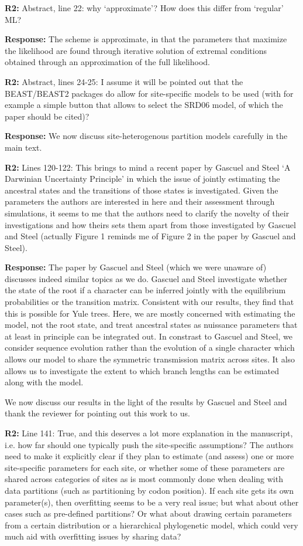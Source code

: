 \documentclass[aps,rmp,onecolumn]{revtex4-1}
\newcommand{\refb}[1]{\textbf{R2:} #1}
\newcommand{\response}[1]{{\color{black}\textbf{Response:} #1}}
\begin{document}
\refb{Abstract, line 22: why ‘approximate’? How does this differ from ‘regular’ ML?}

\response{The scheme is approximate, in that the parameters that maximize the likelihood are found through iterative solution of extremal conditions obtained through an approximation of the full likelihood. }

\refb{Abstract, lines 24-25: I assume it will be pointed out that the BEAST/BEAST2 packages do allow for site-specific models to be used (with for example a simple button that allows to select the SRD06 model, of which the paper should be cited)?}

\response{We now discuss site-heterogenous partition models carefully in the main text.}


\refb{Lines 120-122: This brings to mind a recent paper by Gascuel and Steel ‘A Darwinian Uncertainty Principle’ in which the issue of jointly estimating the ancestral states and the transitions of those states is investigated. Given the parameters the authors are interested in here and their assessment through simulations, it seems to me that the authors need to clarify the novelty of their investigations and how theirs sets them apart from those investigated by Gascuel and Steel (actually Figure 1 reminds me of Figure 2 in the paper by Gascuel and Steel).}

\response{The paper by Gascuel and Steel (which we were unaware of) discusses indeed similar topics as we do. Gascuel and Steel investigate whether the state of the root if a character can be inferred jointly with the equilibrium probabilities or the transition matrix. Consistent with our results, they find that this is possible for Yule trees.
Here, we are mostly concerned with estimating the model, not the root state, and treat ancestral states as nuissance parameters that at least in principle can be integrated out.
In constrast to Gascuel and Steel, we consider sequence evolution rather than the evolution of a single character which allows our model to share the symmetric transmission matrix across sites.
It also allows us to investigate the extent to which branch lengths can be estimated along with the model.

We now discuss our results in the light of the results by Gascuel and Steel and thank the reviewer for pointing out this work to us.
}

\refb{Line 141: True, and this deserves a lot more explanation in the manuscript, i.e. how far should one typically push the site-specific assumptions? The authors need to make it explicitly clear if they plan to estimate (and assess) one or more site-specific parameters for each site, or whether some of these parameters are shared across categories of sites as is most commonly done when dealing with data partitions (such as partitioning by codon position). If each site gets its own parameter(s), then overfitting seems to be a very real issue; but what about other cases such as pre-defined partitions? Or what about drawing certain parameters from a certain distribution or a hierarchical phylogenetic model, which could very much aid with overfitting issues by sharing data?}
\end{document}
